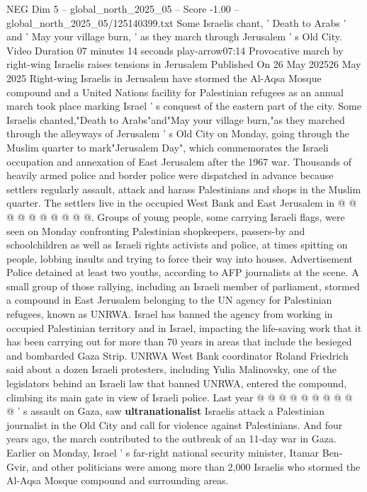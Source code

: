 \begin{textsample}{NEG Dim 5 – global\_north\_2025\_05 – Score -1.00 – global\_north\_2025\_05/125140399.txt}  \label{ex:f5_neg_323}
Some Israelis chant, ' Death to Arabs ' and ' May your village burn, ' as they march through Jerusalem ' s Old City.
Video Duration 07 minutes 14 seconds play-arrow07:14 Provocative march by right-wing Israelis raises tensions in Jerusalem Published On 26 May 202526 May 2025 Right-wing Israelis in Jerusalem have stormed the Al-Aqsa Mosque compound and a United Nations facility for Palestinian refugees as an annual march took place marking Israel ' s conquest of the eastern part of the city.
Some Israelis chanted,"Death to Arabs"and"May your village burn,"as they marched through the alleyways of Jerusalem ' s Old City on Monday, going through the Muslim quarter to mark"Jerusalem Day", which commemorates the Israeli occupation and annexation of East Jerusalem after the 1967 war.
Thousands of heavily armed police and border police were dispatched in advance because settlers regularly assault, attack and harass Palestinians and shops in the Muslim quarter.
The settlers live in the occupied West Bank and East Jerusalem in @ @ @ @ @ @ @ @ @ @.
Groups of young people, some carrying Israeli flags, were seen on Monday confronting Palestinian shopkeepers, passers-by and schoolchildren as well as Israeli rights activists and police, at times spitting on people, lobbing insults and trying to force their way into houses.
Advertisement Police detained at least two youths, according to AFP journalists at the scene.
A small group of those rallying, including an Israeli member of parliament, stormed a compound in East Jerusalem belonging to the UN agency for Palestinian refugees, known as UNRWA.
Israel has banned the agency from working in occupied Palestinian territory and in Israel, impacting the life-saving work that it has been carrying out for more than 70 years in areas that include the besieged and bombarded Gaza Strip.
UNRWA West Bank coordinator Roland Friedrich said about a dozen Israeli protesters, including Yulia Malinovsky, one of the legislators behind an Israeli law that banned UNRWA, entered the compound, climbing its main gate in view of Israeli police.
Last year @ @ @ @ @ @ @ @ @ @ ' s assault on Gaza, saw \textbf{ultranationalist} Israelis attack a Palestinian journalist in the Old City and call for violence against Palestinians.
And four years ago, the march contributed to the outbreak of an 11-day war in Gaza.
Earlier on Monday, Israel ' s far-right national security minister, Itamar Ben-Gvir, and other politicians were among more than 2,000 Israelis who stormed the Al-Aqsa Mosque compound and surrounding areas.

\end{textsample}
